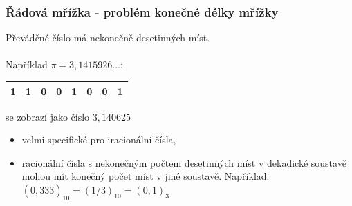   \begin{frame}
    \frametitle{Řádová mřížka - problém konečné délky mřížky}
		
		\begin{minipage}[t][0.5\textheight][t]{\textwidth}
      \boldmath
			\small
      Převáděné číslo má nekonečně desetinných míst. \\ \\
			Například $\pi=3,1415926...$:
      \begin{center}
        \begin{tabular}{| p{5mm} | p{5mm} || p{5mm} | p{5mm} | p{5mm} | p{5mm} | p{5mm} | p{5mm} |}
				 \hline
          1 & 1 & 0 & 0 & 1 & 0 & 0 & 1 \\
         \hline
        \end{tabular}
      \end{center} 
			se zobrazí jako číslo $3,140625$
		\end{minipage}
    
		\begin{minipage}[t][0.4\textheight][t]{\textwidth}
		\boldmath
		\small
      \begin{itemize}
        \item velmi specifické pro iracionální čísla,
				\item racionální čísla s nekonečným počtem desetinných míst v dekadické soustavě mohou mít konečný počet míst v jiné soustavě. Například: \\
				$(0,33\bar{3})_{10}=(1/3)_{10}=(0,1)_{3}$
      \end{itemize}
		\end{minipage}
		
	\end{frame}
	
